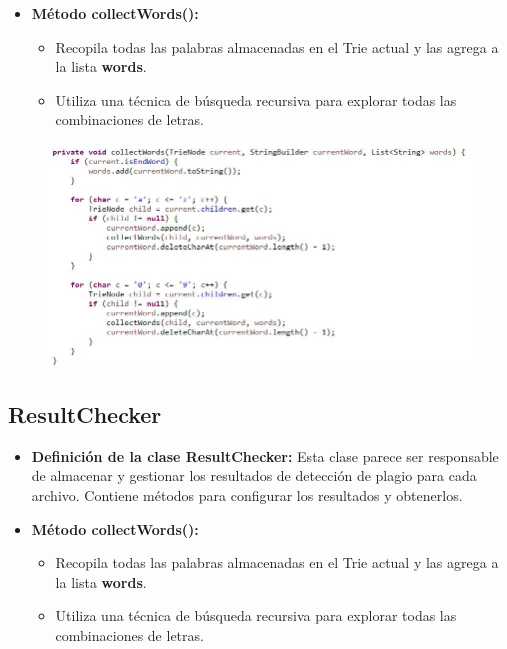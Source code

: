 \documentclass{article}
\begin{document}
	\begin{itemize}
	\item \textbf{Método collectWords():}
	 \begin{itemize}
	 \item Recopila todas las palabras almacenadas en el Trie actual y las agrega a la lista \textbf{words}. 
	 \item Utiliza una técnica de búsqueda recursiva para explorar todas las combinaciones de letras.
	 \end{itemize}
	\end{itemize}
	 \begin{figure}[H]
		\centering
		\includegraphics[width=1\textwidth,keepaspectratio]{img/TN8.jpg}
	\end{figure}
	
	 \subsection{ResultChecker}
	\begin{itemize}
	\item \textbf{Definición de la clase ResultChecker:} Esta clase parece ser responsable de almacenar y gestionar los resultados de detección de plagio para cada archivo. Contiene métodos para configurar los resultados y obtenerlos.
	\end{itemize}	 
	
	\begin{itemize}
	\item \textbf{Método collectWords():}
	 \begin{itemize}
	 \item Recopila todas las palabras almacenadas en el Trie actual y las agrega a la lista \textbf{words}. 
	 \item Utiliza una técnica de búsqueda recursiva para explorar todas las combinaciones de letras.
	 \end{itemize}
	\end{itemize}
	
\end{document}
